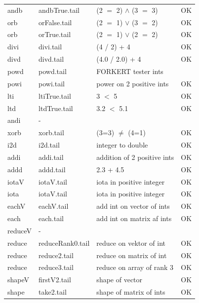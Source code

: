\documentclass[11pt]{article}
\begin{document}
\begin{center}
\begin{tabular}{l l l l}
andb 		& andbTrue.tail 		& (2 $=$ 2) $\land$ (3 $=$ 3)	& OK \\
orb			& orFalse.tail		& (2 $=$ 1) $\lor$ (3 $=$ 2)		& OK \\
orb			& orTrue.tail		& (2 $=$ 1) $\lor$ (2 $=$ 2)		& OK \\
divi 			& divi.tail			& (4 / 2) + 4				& OK \\
divd			& divd.tail			& (4.0 / 2.0) + 4				& OK \\
powd			& powd.tail			&  FORKERT tester ints		&  \\
powi			& powi.tail			& power on 2 positive ints		& OK \\
lti			& ltiTrue.tail 		& 3 $<$ 5					& OK \\
ltd			& ltdTrue.tail 		& 3.2 $<$ 5.1					& OK \\
andi			& - 				& 				          	& \\
xorb			&  xorb.tail 		& (3=3) $\neq$ (4=1)				& OK \\
i2d 			& i2d.tail			& integer to double 			& OK \\
addi 			& addi.tail 			& addition of 2 positive ints		& OK \\ 
addd 		& addd.tail 		& 2.3 + 4.5					& OK \\
iotaV 		& iotaV.tail			& iota in positive integer		& OK \\
iota	 		& iotaV.tail			& iota in positive integer		& OK \\
eachV		& eachV.tail  		& add int on vector of ints 		& OK \\
each			& each.tail			& add int on matrix af ints 		& OK \\
reduceV		& - 				&						&  \\
reduce		& reduceRank0.tail	& reduce on vektor of int		& OK \\
reduce 		& reduce2.tail		& reduce on matrix of int		& OK \\
reduce 		& reduce3.tail		& reduce on array of rank 3 	& OK \\	
shapeV		& firstV2.tail		& shape of vector			& OK \\
shape		& take2.tail		& shape of matrix of ints		& OK \\
\end{tabular}
\end{center}
\end{document}
